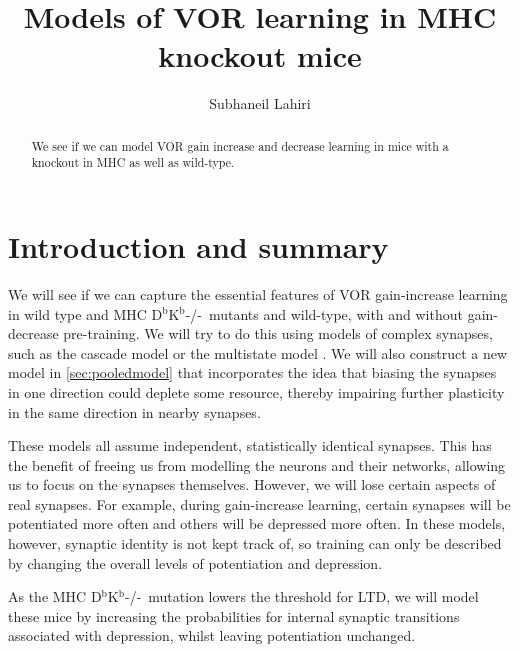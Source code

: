 \documentclass[12pt]{article}
\title{Models of VOR learning in MHC knockout mice}
\author{Subhaneil Lahiri
%
}
\newcommand{\KO}{D$^\mathrm{b}$K$^\mathrm{b}$-/-}
\begin{document}
\maketitle




\begin{abstract}
  We see if we can model VOR gain increase and decrease learning in mice with a knockout in MHC as well as wild-type.
\end{abstract}

\tableofcontents


\section{Introduction and summary}\label{sec:intro}

We will see if we can capture the essential features of VOR gain-increase learning in wild type and MHC \KO\ mutants and wild-type, with and without gain-decrease pre-training.
We will try to do this using models of complex synapses, such as the cascade model \cite{Fusi2005cascade} or the multistate model \cite{amit1994learning,Fusi2007multistate}.
We will also construct a new model in \autoref{sec:pooledmodel} that incorporates the idea that biasing the synapses in one direction could deplete some resource, thereby impairing further plasticity in the same direction in nearby synapses.

These models all assume independent, statistically identical synapses.
This has the benefit of freeing us from modelling the neurons and their networks, allowing us to focus on the synapses themselves.
However, we will lose certain aspects of real synapses.
For example, during gain-increase learning, certain synapses will be potentiated more often and others will be depressed more often.
In these models, however, synaptic identity is not kept track of, so training can only be described by changing the overall levels of potentiation and depression.

As the MHC \KO\ mutation lowers the threshold for LTD, we will model these mice by increasing the probabilities for internal synaptic transitions associated with depression, whilst leaving potentiation unchanged.
\end{document}

